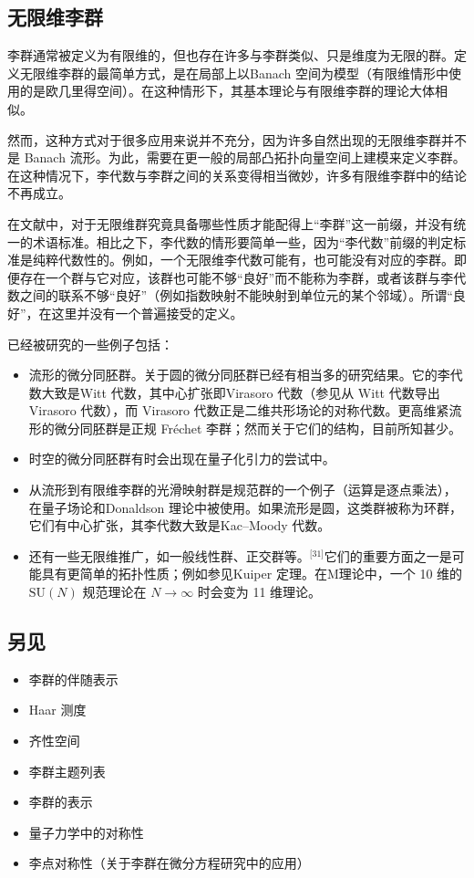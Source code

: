 \subsection{无限维李群}
李群通常被定义为有限维的，但也存在许多与李群类似、只是维度为无限的群。定义无限维李群的最简单方式，是在局部上以Banach 空间为模型（有限维情形中使用的是欧几里得空间）。在这种情形下，其基本理论与有限维李群的理论大体相似。

然而，这种方式对于很多应用来说并不充分，因为许多自然出现的无限维李群并不是 Banach 流形。为此，需要在更一般的局部凸拓扑向量空间上建模来定义李群。在这种情况下，李代数与李群之间的关系变得相当微妙，许多有限维李群中的结论不再成立。

在文献中，对于无限维群究竟具备哪些性质才能配得上“李群”这一前缀，并没有统一的术语标准。相比之下，李代数的情形要简单一些，因为“李代数”前缀的判定标准是纯粹代数性的。例如，一个无限维李代数可能有，也可能没有对应的李群。即便存在一个群与它对应，该群也可能不够“良好”而不能称为李群，或者该群与李代数之间的联系不够“良好”（例如指数映射不能映射到单位元的某个邻域）。所谓“良好”，在这里并没有一个普遍接受的定义。

已经被研究的一些例子包括：
\begin{itemize}
\item 流形的微分同胚群。关于圆的微分同胚群已经有相当多的研究结果。它的李代数大致是Witt 代数，其中心扩张即Virasoro 代数（参见从 Witt 代数导出 Virasoro 代数），而 Virasoro 代数正是二维共形场论的对称代数。更高维紧流形的微分同胚群是正规 Fréchet 李群；然而关于它们的结构，目前所知甚少。
\item 时空的微分同胚群有时会出现在量子化引力的尝试中。
\item 从流形到有限维李群的光滑映射群是规范群的一个例子（运算是逐点乘法），在量子场论和Donaldson 理论中被使用。如果流形是圆，这类群被称为环群，它们有中心扩张，其李代数大致是Kac–Moody 代数。
\item 还有一些无限维推广，如一般线性群、正交群等。\(^\text{[31]}\)它们的重要方面之一是可能具有更简单的拓扑性质；例如参见Kuiper 定理。在M理论中，一个 10 维的 $\mathrm{SU}(N)$ 规范理论在 $N \to \infty$ 时会变为 11 维理论。
\end{itemize}
\subsection{另见}
\begin{itemize}
\item 李群的伴随表示
\item Haar 测度
\item 齐性空间
\item 李群主题列表
\item 李群的表示
\item 量子力学中的对称性
\item 李点对称性（关于李群在微分方程研究中的应用）
\end{itemize}

